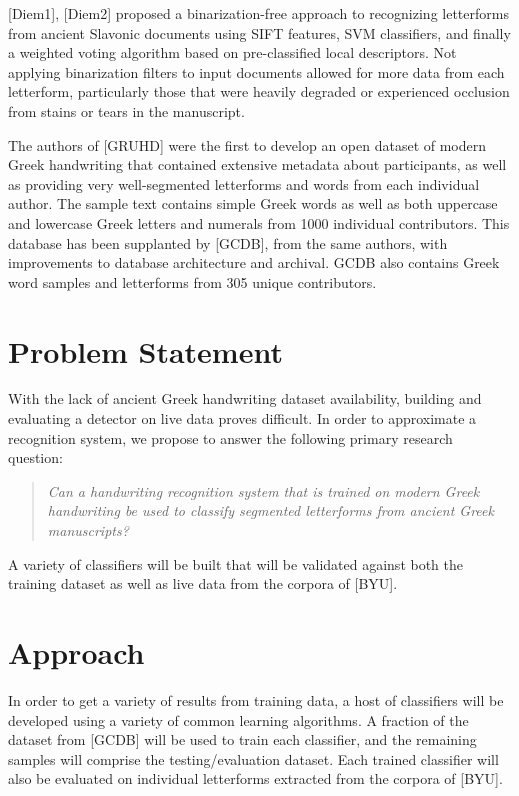 \documentclass[10pt,twocolumn,letterpaper]{article}
\begin{document}
[Diem1], [Diem2] proposed a binarization-free approach to recognizing letterforms from ancient Slavonic documents using SIFT features, SVM classifiers, and finally a weighted voting algorithm based on pre-classified local descriptors. Not applying binarization filters to input documents allowed for more data from each letterform, particularly those that were heavily degraded or experienced occlusion from stains or tears in the manuscript.

The authors of [GRUHD] were the first to develop an open dataset of modern Greek handwriting that contained extensive metadata about participants, as well as providing very well-segmented letterforms and words from each individual author. The sample text contains simple Greek words as well as both uppercase and lowercase Greek letters and numerals from 1000 individual contributors. This database has been supplanted by [GCDB], from the same authors, with improvements to database architecture and archival. GCDB also contains Greek word samples and letterforms from 305 unique contributors.

\section{Problem Statement}

With the lack of ancient Greek handwriting dataset availability, building and evaluating a detector on live data proves difficult. In order to approximate a recognition system, we propose to answer the following primary research question:

\begin{quote}
    \textit{Can a handwriting recognition system that is trained on modern Greek handwriting be used to classify segmented letterforms from ancient Greek manuscripts?}
\end{quote}

A variety of classifiers will be built that will be validated against both the training dataset as well as live data from the corpora of [BYU].

\section{Approach}

In order to get a variety of results from training data, a host of classifiers will be developed using a variety of common learning algorithms. A fraction of the dataset from [GCDB] will be used to train each classifier, and the remaining samples will comprise the testing/evaluation dataset. Each trained classifier will also be evaluated on individual letterforms extracted from the corpora of [BYU].
\end{document}
